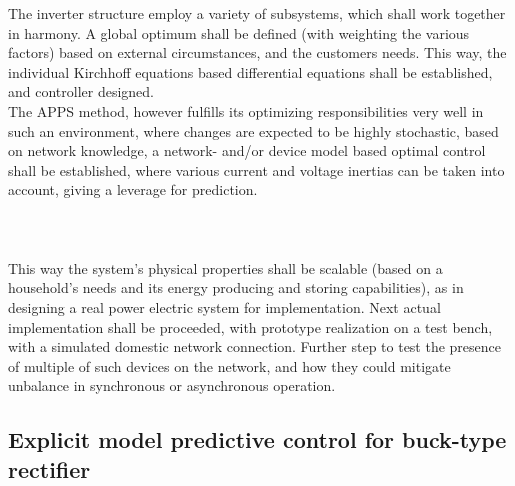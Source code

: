 		The inverter structure employ a variety of subsystems, which shall work together in harmony. A global optimum shall be defined (with weighting the various factors) based on external circumstances, and the customers needs. This way, the individual Kirchhoff equations based differential equations shall be established, and controller designed.\\
		The APPS method, however fulfills its optimizing responsibilities very well in such an environment, where changes are expected to be highly stochastic, based on network knowledge, a network- and/or device model based optimal control shall be established, where various current and voltage inertias can be taken into account, giving a leverage for prediction.\\
        \\
        \\
        \\
        This way the system's physical properties shall be scalable (based on a household's needs and its energy producing and storing capabilities), as in designing a real power electric system for implementation. Next actual implementation shall be proceeded, with prototype realization on a test bench, with a simulated domestic network connection. Further step to test the presence of multiple of such devices on the network, and how they could mitigate unbalance in synchronous or asynchronous operation. \\
        
		
		\subsection{Explicit model predictive control for buck-type rectifier}
		
